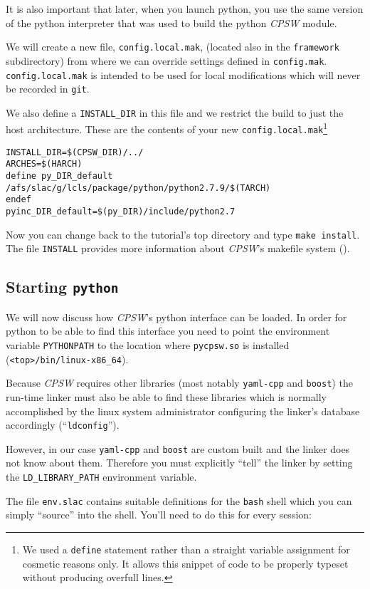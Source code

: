 \documentclass[10pt]{article}
\newcommand{\ita}[1]{\emph{#1}}
\newcommand{\cpsw}      {\ita {CPSW}}
\newcommand{\py}        {python}
\newcommand{\cod}[1] {{\tt#1}}
\begin{document}
It is also important that later, when you launch \py{}, you use the same version
of the \py{} interpreter that was used to build the \py{} \cpsw{} module.

We will create a new file, \cod{config.local.mak}, (located also in the \cod{framework}
subdirectory) from where we can override settings defined in \cod{config.mak}.
\cod{config.local.mak} is intended to be used for local modifications which will
never be recorded in \cod{git}.

We also define a \cod{INSTALL\_DIR} in this file and we restrict the build to
just the host architecture. These are the contents of your new
\cod{config.local.mak}\footnote{We used a \cod{define} statement rather
than a straight variable assignment for cosmetic reasons only. It allows this
snippet of code to be properly typeset without producing overfull lines.}
\begin{verbatim}
INSTALL_DIR=$(CPSW_DIR)/../
ARCHES=$(HARCH)
define py_DIR_default
/afs/slac/g/lcls/package/python/python2.7.9/$(TARCH)
endef
pyinc_DIR_default=$(py_DIR)/include/python2.7
\end{verbatim}

Now you can change back to the tutorial's top directory and type \cod{make install}.
The file \cod{INSTALL} provides more information about \cpsw{}'s
makefile system (\cite{INSTALL, makefile}).

\subsection{Starting \cod{\py}}
We will now discuss how \cpsw{}'s \py{} interface can be loaded. In order for
\py{} to be able to find this interface you need to point the environment variable
\cod{PYTHONPATH} to the location where \cod{pycpsw.so} is installed
(\cod{<top>/bin/linux-x86\_64}).

Because \cpsw{} requires other libraries (most notably \cod{yaml-cpp} and \cod{boost})
the run-time linker must also be able to find these libraries which is normally
accomplished by the linux system administrator configuring the linker's database
accordingly (``\cod{ldconfig}'').

However, in our case \cod{yaml-cpp} and \cod{boost} are custom built and the linker
does not know about them. Therefore you must explicitly ``tell'' the linker by setting
the \cod{LD\_LIBRARY\_PATH} environment variable.

The file \cod{env.slac} contains suitable definitions for the \cod{bash} shell which
you can simply ``source'' into the shell. You'll need to do this for every session:
\end{document}
